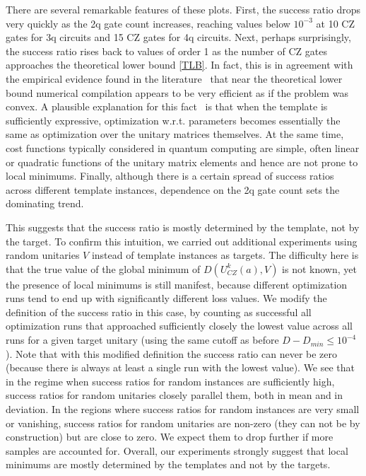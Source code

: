 \documentclass[draft, twocolumn, amsfonts, amssymb, aps, nofootinbib]{revtex4-2}
\newcommand{\CZ}{\textsf{CZ }}
\begin{document}
There are several remarkable features of these plots. First, the success ratio drops very quickly as the 2q gate count increases, reaching values below $10^{-3}$ at 10 \CZ gates for 3q circuits and 15 \CZ gates for 4q circuits. Next, perhaps surprisingly, the success ratio rises back to values of order 1 as the number of \CZ gates approaches the theoretical lower bound \eqref{TLB}. In fact, this is in agreement with the empirical evidence found in the literature~\cite{Madden2021, Rakyta2021, Kiani2020} that near the theoretical lower bound numerical compilation appears to be very efficient as if the problem was convex. A plausible explanation for this fact~\cite{Ge2022} is that when the template is sufficiently expressive, optimization w.r.t. parameters becomes essentially the same as optimization over the unitary matrices themselves. At the same time, cost functions typically considered in quantum computing are simple, often linear or quadratic functions of the unitary matrix elements and hence are not prone to local minimums. Finally, although there is a certain spread of success ratios across different template instances, dependence on the 2q gate count sets the dominating trend.

This suggests that the success ratio is mostly determined by the template, not by the target. To confirm this  intuition,  we carried out additional experiments using random unitaries $V$ instead of template instances as targets. The difficulty here is that the true value of the global minimum of $D(U^k_{CZ}(a), V)$ is not known, yet the presence of local minimums is still manifest, because different optimization runs tend to end up with significantly different loss values. We modify the definition of the success ratio in this case, by counting as successful all optimization runs that approached sufficiently closely the lowest value across all runs for a given target unitary (using the same cutoff as before $D-D_{min}\le 10^{-4}$). Note that with this modified definition the success ratio can never be zero (because there is always at least a single run with the lowest value). We see that in the regime when success ratios for random instances are sufficiently high, success ratios for random unitaries closely parallel them, both in mean and in deviation. In the regions where success ratios for random instances are very small or vanishing, success ratios for random unitaries are non-zero (they can not be by construction) but are close to zero. We expect them to drop further if more samples are accounted for. Overall, our experiments strongly suggest that local minimums are mostly determined by the templates and not by the targets.
\end{document}

